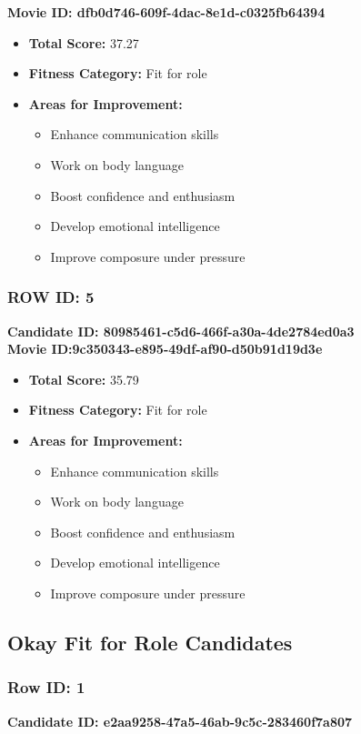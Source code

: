 \documentclass{article}
\begin{document}
\textbf{Movie ID: dfb0d746-609f-4dac-8e1d-c0325fb64394}
\begin{itemize}
    \item \textbf{Total Score:} 37.27
    \item \textbf{Fitness Category:} Fit for role
    \item \textbf{Areas for Improvement:}
    \begin{itemize}
        \item Enhance communication skills
        \item Work on body language
        \item Boost confidence and enthusiasm
        \item Develop emotional intelligence
        \item Improve composure under pressure
    \end{itemize}
\end{itemize}

\subsubsection{ROW ID: 5 }
\textbf{Candidate ID: 80985461-c5d6-466f-a30a-4de2784ed0a3}\\

\textbf{Movie ID:9c350343-e895-49df-af90-d50b91d19d3e}
\begin{itemize}
    \item \textbf{Total Score:} 35.79
    \item \textbf{Fitness Category:} Fit for role
    \item \textbf{Areas for Improvement:}
    \begin{itemize}
        \item Enhance communication skills
        \item Work on body language
        \item Boost confidence and enthusiasm
        \item Develop emotional intelligence
        \item Improve composure under pressure
    \end{itemize}
\end{itemize}

\subsection{Okay Fit for Role Candidates}

\subsubsection{Row ID: 1}
\textbf{Candidate ID: e2aa9258-47a5-46ab-9c5c-283460f7a807}\\
\end{document}
